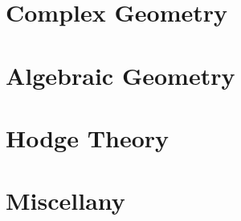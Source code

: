 \documentclass[11pt,openany]{book}
\begin{document}
\part{Complex Geometry}\label{part-complex-geometry}










\part{Algebraic Geometry}\label{part-algebraic-geometry}














\part{Hodge Theory}\label{part-hodge-theory}













\part{Miscellany}\label{part-miscellany}
\ifplastex\else
  \cleardoublepage
\fi


\end{document}
